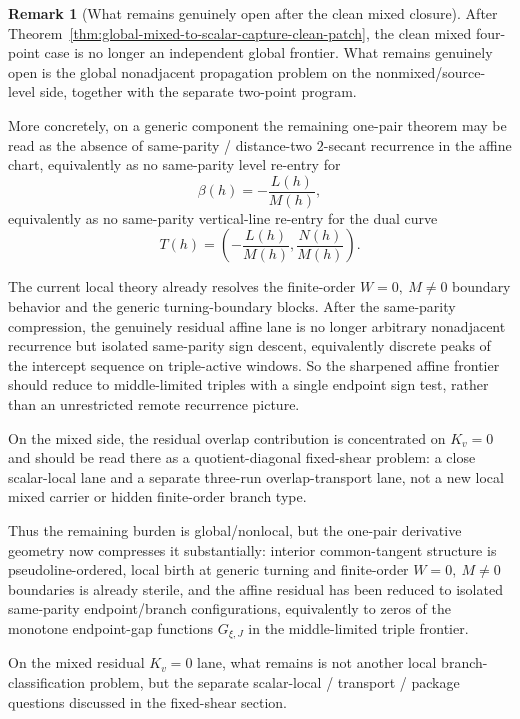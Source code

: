 \documentclass[11pt,a4paper]{amsart}
\theoremstyle{plain}
\theoremstyle{definition}
\newtheorem{remark}[theorem]{Remark}
\begin{document}
\begin{remark}[What remains genuinely open after the clean mixed closure]
\label{rem:what-remains-open-after-clean-mixed-closure}
After
Theorem~\ref{thm:global-mixed-to-scalar-capture-clean-patch},
the clean mixed four-point case is no longer an independent global frontier.
What remains genuinely open is the global nonadjacent propagation problem on the
nonmixed/source-level side, together with the separate two-point program.

More concretely, on a generic component the remaining one-pair theorem may be
read as the absence of same-parity / distance-two $2$-secant recurrence in the
affine chart, equivalently as no same-parity level re-entry for
\[
\beta(h)=-\frac{L(h)}{M(h)},
\]
equivalently as no same-parity vertical-line re-entry for the dual curve
\[
T(h)=\left(-\frac{L(h)}{M(h)},\frac{N(h)}{M(h)}\right).
\]

The current local theory already resolves the finite-order
$W=0,\ M\neq 0$ boundary behavior and the generic turning-boundary blocks.
After the same-parity compression, the genuinely residual affine lane is no
longer arbitrary nonadjacent recurrence but isolated same-parity sign descent,
equivalently discrete peaks of the intercept sequence on triple-active windows.
So the sharpened affine frontier should reduce to middle-limited triples with a
single endpoint sign test, rather than an unrestricted remote recurrence
picture.

On the mixed side, the residual overlap contribution is concentrated on
$K_v=0$ and should be read there as a quotient-diagonal fixed-shear problem:
a close scalar-local lane and a separate three-run overlap-transport lane, not
a new local mixed carrier or hidden finite-order branch type.

Thus the remaining burden is global/nonlocal, but the one-pair derivative
geometry now compresses it substantially: interior common-tangent structure is
pseudoline-ordered, local birth at generic turning and finite-order
$W=0,\ M\neq 0$ boundaries is already sterile, and the affine residual has been
reduced to isolated same-parity endpoint/branch configurations, equivalently to
zeros of the monotone endpoint-gap functions $G_{\xi,J}$ in the middle-limited
triple frontier.

On the mixed residual $K_v=0$ lane, what remains is not another local
branch-classification problem, but the separate scalar-local / transport /
package questions discussed in the fixed-shear section.
\end{remark}
\end{document}
